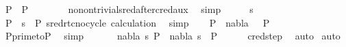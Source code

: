 \begin{isabellebody}
\ {\isachardoublequoteopen}P{\isacharprime}{\kern0pt}\ {\isacharequal}{\kern0pt}\ P{\isacharprime}{\kern0pt}{\isacharprime}{\kern0pt}{\isachardoublequoteclose}\ \isanewline
\ \ \ \ \isamarkupfalse%
\ \ no{\isacharunderscore}{\kern0pt}nontrivial{\isacharunderscore}{\kern0pt}sred{\isacharunderscore}{\kern0pt}after{\isacharunderscore}{\kern0pt}cred{\isacharunderscore}{\kern0pt}aux\ \isamarkupfalse%
\ simp\isanewline
\ \ \isamarkupfalse%
\ \isamarkupfalse%
\ {\isachardoublequoteopen}s{}\ {\isacharequal}{\kern0pt}{\isacharbrackleft}{\kern0pt}{\isacharbrackright}{\kern0pt}{\isachardoublequoteclose}\isanewline
\ \ \ \ \isamarkupfalse%
\ {\isacartoucheopen}P{\isacharprime}{\kern0pt}\ {\isasymturnstile}\ s{}\ {\isasymleadsto}\isactrlsup {\isacharasterisk}{\kern0pt}\ P{\isacharprime}{\kern0pt}{\isacharprime}{\kern0pt}{\isacartoucheclose}\ sred{\isacharunderscore}{\kern0pt}rtc{\isacharunderscore}{\kern0pt}no{\isacharunderscore}{\kern0pt}cycle\ calculation\ \isamarkupfalse%
\ simp\isanewline
\ \ \isamarkupfalse%
\ {\isachardoublequoteopen}P{\isacharprime}{\kern0pt}\ {\isasymTurnstile}\ {\isacharparenleft}{\kern0pt}nabla{}{\isacharcomma}{\kern0pt}\ {\isacharbrackleft}{\kern0pt}{\isacharbrackright}{\kern0pt}{\isacharparenright}{\kern0pt}\ {\isasymRightarrow}\ P{}{\isachardoublequoteclose}\ \isanewline
\ \ \ \ \isamarkupfalse%
\ P{\isacharunderscore}{\kern0pt}prime{\isacharunderscore}{\kern0pt}to{\isacharunderscore}{\kern0pt}P{}\ \isamarkupfalse%
\ simp\isanewline
\ \ \isamarkupfalse%
\ {}{\isacharparenleft}{\kern0pt}{}{\isacharparenright}{\kern0pt}\ \isamarkupfalse%
\ {\isachardoublequoteopen}{\isasymexists}nabla{}\ s{}{\isachardot}{\kern0pt}\ P{}\ {\isasymTurnstile}\ {\isacharparenleft}{\kern0pt}nabla{}{\isacharcomma}{\kern0pt}\ s{}{\isacharparenright}{\kern0pt}\ {\isasymRightarrow}\ P{}{\isachardoublequoteclose}\isanewline
\ \ \ \ \isamarkupfalse%
\ cred{\isacharunderscore}{\kern0pt}step\ \isamarkupfalse%
\ auto\isanewline
{}\isamarkupfalse%
\ {\isacharparenleft}{\kern0pt}auto{\isacharparenright}{\kern0pt}%
\endisatagproof
{\isafoldproof}%
%
\isadelimproof
%
\endisadelimproof
%
\begin{isamarkuptext}%

\end{isamarkuptext}
\end{isabellebody}
